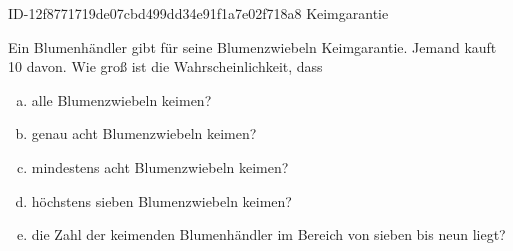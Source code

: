 \begin{exercise}
      {ID-12f8771719de07cbd499dd34e91f1a7e02f718a8}
      {Keimgarantie}
  \ifproblem\problem\par
    Ein Blumenhändler gibt für seine Blumenzwiebeln  Keimgarantie.
    Jemand kauft 10 davon. Wie groß ist die Wahrscheinlichkeit, dass
    \begin{enumerate}[a)]
      \item alle Blumenzwiebeln keimen?
      \item genau acht Blumenzwiebeln keimen?
      \item mindestens acht Blumenzwiebeln keimen?
      \item höchstens sieben Blumenzwiebeln keimen?
      \item die Zahl der keimenden Blumenhändler im Bereich von sieben bis
            neun liegt?
    \end{enumerate}
  \fi
\end{exercise}
